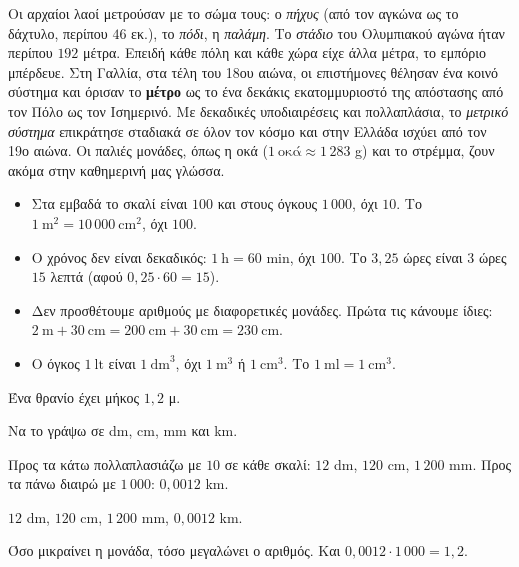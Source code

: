 
Οι αρχαίοι λαοί μετρούσαν με το σώμα τους: ο \emph{πήχυς} (από τον αγκώνα ως το δάχτυλο, περίπου $46$ εκ.), το \emph{πόδι}, η \emph{παλάμη}. Το \emph{στάδιο} του Ολυμπιακού αγώνα ήταν περίπου $192$ μέτρα. Επειδή κάθε πόλη και κάθε χώρα είχε άλλα μέτρα, το εμπόριο μπέρδευε. Στη Γαλλία, στα τέλη του 18ου αιώνα, οι επιστήμονες θέλησαν ένα κοινό σύστημα και όρισαν το \textbf{μέτρο} ως το ένα δεκάκις εκατομμυριοστό της απόστασης από τον Πόλο ως τον Ισημερινό. Με δεκαδικές υποδιαιρέσεις και πολλαπλάσια, το \emph{μετρικό σύστημα} επικράτησε σταδιακά σε όλον τον κόσμο και στην Ελλάδα ισχύει από τον 19ο αιώνα. Οι παλιές μονάδες, όπως η οκά ($1\ \text{οκά}\approx1\,283$ g) και το στρέμμα, ζουν ακόμα στην καθημερινή μας γλώσσα.

\begin{prosoxi}
\begin{itemize}[leftmargin=1.2em,itemsep=0.3ex,topsep=2pt]
\item Στα εμβαδά το σκαλί είναι $100$ και στους όγκους $1\,000$, όχι $10$. Το $1\ \mathrm{m}^2=10\,000\ \mathrm{cm}^2$, όχι $100$.
\item Ο χρόνος δεν είναι δεκαδικός: $1\ \mathrm{h}=60$ min, όχι $100$. Το $3{,}25$ ώρες είναι $3$ ώρες $15$ λεπτά (αφού $0{,}25\cdot60=15$).
\item Δεν προσθέτουμε αριθμούς με διαφορετικές μονάδες. Πρώτα τις κάνουμε ίδιες: $2\ \mathrm{m}+30\ \mathrm{cm}=200\ \mathrm{cm}+30\ \mathrm{cm}=230\ \mathrm{cm}$.
\item Ο όγκος $1\ \mathrm{lt}$ είναι $1\ \mathrm{dm}^3$, όχι $1\ \mathrm{m}^3$ ή $1\ \mathrm{cm}^3$. Το $1\ \mathrm{ml}=1\ \mathrm{cm}^3$.
\end{itemize}
\end{prosoxi}


\tixero Ένα θρανίο έχει μήκος $1{,}2$ μ.\par
\tithelo Να το γράψω σε dm, cm, mm και km.\par
\possindeo Προς τα κάτω πολλαπλασιάζω με $10$ σε κάθε σκαλί: $12$ dm, $120$ cm, $1\,200$ mm. Προς τα πάνω διαιρώ με $1\,000$: $0{,}0012$ km.\par
\apantisi $12$ dm, $120$ cm, $1\,200$ mm, $0{,}0012$ km.\par
\elegxos Όσο μικραίνει η μονάδα, τόσο μεγαλώνει ο αριθμός. Και $0{,}0012\cdot1\,000=1{,}2$.

